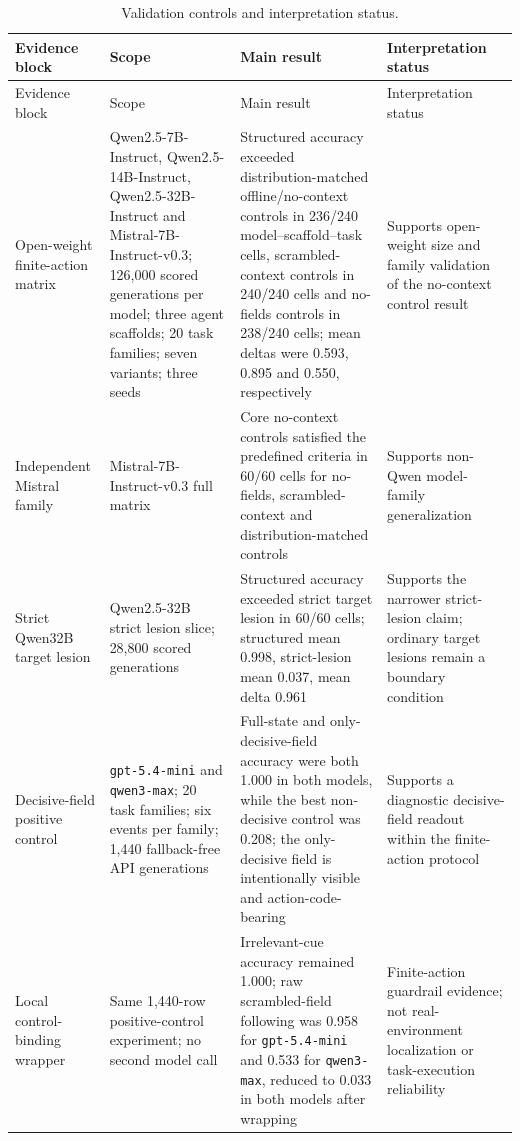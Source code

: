 \documentclass[11pt]{article}
\begin{document}
\scriptsize
\setlength{\LTleft}{0pt}
\setlength{\LTright}{0pt}
\begin{longtable}{p{}p{}p{}p{}}
\caption{Validation controls and interpretation status.}
\label{tab:s33_validation}\\
\toprule
Evidence block & Scope & Main result & Interpretation status \\
\midrule
\endfirsthead
\toprule
Evidence block & Scope & Main result & Interpretation status \\
\midrule
\endhead
Open-weight finite-action matrix & Qwen2.5-7B-Instruct, Qwen2.5-14B-Instruct, Qwen2.5-32B-Instruct and Mistral-7B-Instruct-v0.3; 126,000 scored generations per model; three agent scaffolds; 20 task families; seven variants; three seeds & Structured accuracy exceeded distribution-matched offline/no-context controls in 236/240 model--scaffold--task cells, scrambled-context controls in 240/240 cells and no-fields controls in 238/240 cells; mean deltas were 0.593, 0.895 and 0.550, respectively & Supports open-weight size and family validation of the no-context control result \\
Independent Mistral family & Mistral-7B-Instruct-v0.3 full matrix & Core no-context controls satisfied the predefined criteria in 60/60 cells for no-fields, scrambled-context and distribution-matched controls & Supports non-Qwen model-family generalization \\
Strict Qwen32B target lesion & Qwen2.5-32B strict lesion slice; 28,800 scored generations & Structured accuracy exceeded strict target lesion in 60/60 cells; structured mean 0.998, strict-lesion mean 0.037, mean delta 0.961 & Supports the narrower strict-lesion claim; ordinary target lesions remain a boundary condition \\
Decisive-field positive control & \texttt{gpt-5.4-mini} and \texttt{qwen3-max}; 20 task families; six events per family; 1,440 fallback-free API generations & Full-state and only-decisive-field accuracy were both 1.000 in both models, while the best non-decisive control was 0.208; the only-decisive field is intentionally visible and action-code-bearing & Supports a diagnostic decisive-field readout within the finite-action protocol \\
Local control-binding wrapper & Same 1,440-row positive-control experiment; no second model call & Irrelevant-cue accuracy remained 1.000; raw scrambled-field following was 0.958 for \texttt{gpt-5.4-mini} and 0.533 for \texttt{qwen3-max}, reduced to 0.033 in both models after wrapping & Finite-action guardrail evidence; not real-environment localization or task-execution reliability \\

\end{longtable}
\end{document}
